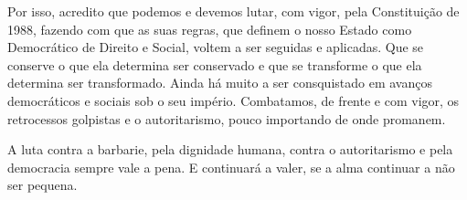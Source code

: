 Por isso, acredito que podemos e devemos lutar, com vigor, pela
Constituição de 1988, fazendo com que as suas regras, que definem o nosso
Estado como Democrático de Direito e Social, voltem a ser seguidas e
aplicadas. Que se conserve o que ela determina ser conservado e que
se transforme o que ela determina ser transformado. Ainda há muito
a ser consquistado em avanços democráticos e sociais sob o seu império.
Combatamos, de frente e com vigor, os retrocessos golpistas e o
autoritarismo, pouco importando de onde promanem.

A luta contra a barbarie, pela dignidade humana, contra o autoritarismo
e pela democracia sempre vale a pena. E continuará a valer, se a alma
continuar a não ser pequena.
